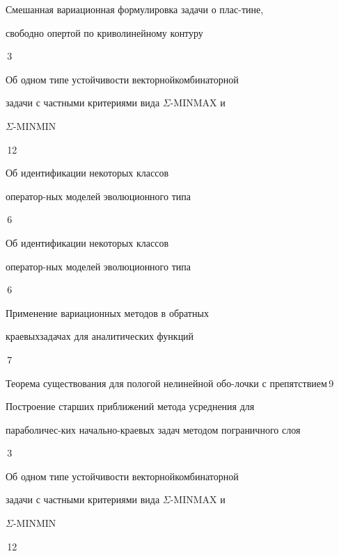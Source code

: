

{Смешанная вариационная формулировка задачи о плас-\newline тине, 


свободно опертой по криволинейному контуру}{\No\,3} 




{Об одном типе устойчивости векторной\newline комбинаторной


задачи с частными критериями вида $\Sigma$-MINMAX и


$\Sigma$-MINMIN}{\No\,12}




{Об идентификации некоторых классов


оператор-\newline ных моделей эволюционного типа}{\No\,6}




{Об идентификации некоторых классов


оператор-\newline ных моделей эволюционного типа}{\No\,6}










{Применение вариационных методов в обратных


краевых\newline задачах для аналитических функций}{\No\,7}




{Теорема существования для пологой нелинейной обо-\newline лочки с препятствием}{\No\,9}




{Построение старших приближений метода усреднения для


параболичес-\newline ких начально-краевых задач методом пограничного слоя}{\No\,3}




{Об одном типе устойчивости векторной\newline комбинаторной


задачи с частными критериями вида $\Sigma$-MINMAX и


$\Sigma$-MINMIN}{\No\,12}


